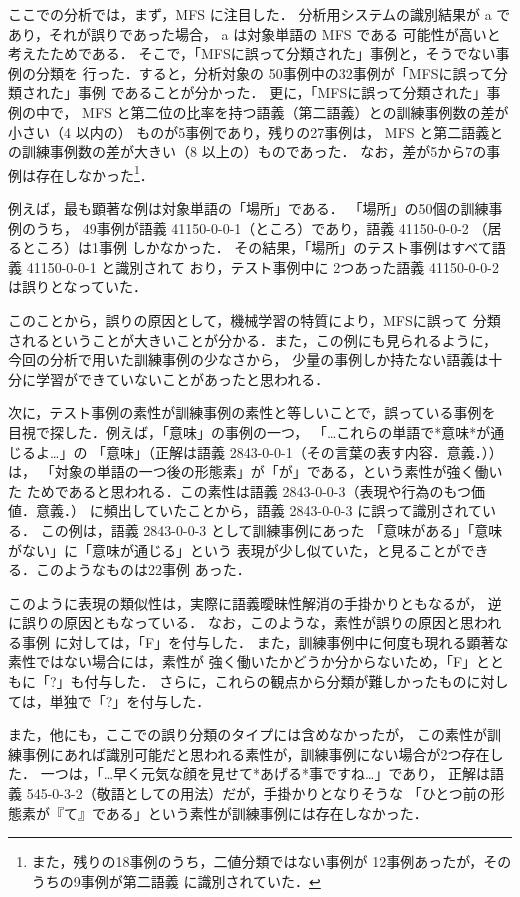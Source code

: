 \documentclass[japanese]{jnlp_1.4}
\begin{document}
ここでの分析では，まず，MFS に注目した．
分析用システムの識別結果が a であり，それが誤りであった場合，
a は対象単語の MFS である
可能性が高いと考えたためである．
そこで，「MFSに誤って分類された」事例と，そうでない事例の分類を
行った．すると，分析対象の 50事例中の32事例が「MFSに誤って分類された」事例
であることが分かった．
更に，「MFSに誤って分類された」事例の中で，
MFS と第二位の比率を持つ語義（第二語義）との訓練事例数の差が小さい（4 以内の）
ものが5事例であり，残りの27事例は，
MFS と第二語義との訓練事例数の差が大きい（8 以上の）ものであった．
なお，差が5から7の事例は存在しなかった\footnote{また，残りの18事例のうち，二値分類ではない事例が
12事例あったが，そのうちの9事例が第二語義
に識別されていた．}．


例えば，最も顕著な例は対象単語の「場所」である．
「場所」の50個の訓練事例のうち，
49事例が語義 41150-0-0-1（ところ）であり，語義 41150-0-0-2 （居るところ）は1事例
しかなかった．
その結果，「場所」のテスト事例はすべて語義 41150-0-0-1 と識別されて
おり，テスト事例中に 2つあった語義 41150-0-0-2は誤りとなっていた．

このことから，誤りの原因として，機械学習の特質により，MFSに誤って
分類されるということが大きいことが分かる．また，この例にも見られるように，
今回の分析で用いた訓練事例の少なさから，
少量の事例しか持たない語義は十分に学習ができていないことがあったと思われる．


次に，テスト事例の素性が訓練事例の素性と等しいことで，誤っている事例を
目視で探した．例えば，「意味」の事例の一つ，
「…これらの単語で*意味*が通じるよ…」の
「意味」（正解は語義 2843-0-0-1（その言葉の表す内容．意義．））は，
「対象の単語の一つ後の形態素」が「が」である，という素性が強く働いた
ためであると思われる．この素性は語義 2843-0-0-3（表現や行為のもつ価値．意義．）
に頻出していたことから，語義 2843-0-0-3 に誤って識別されている．
この例は，語義 2843-0-0-3 として訓練事例にあった
「意味がある」「意味がない」に「意味が通じる」という
表現が少し似ていた，と見ることができる．このようなものは22事例 あった．

このように表現の類似性は，実際に語義曖昧性解消の手掛かりともなるが，
逆に誤りの原因ともなっている．
なお，このような，素性が誤りの原因と思われる事例 に対しては，「F」を付与した．
また，訓練事例中に何度も現れる顕著な素性ではない場合には，素性が
強く働いたかどうか分からないため，「F」とともに「?」も付与した．
さらに，これらの観点から分類が難しかったものに対しては，単独で「?」を付与した．

また，他にも，ここでの誤り分類のタイプには含めなかったが，
この素性が訓練事例にあれば識別可能だと思われる素性が，訓練事例にない場合が2つ存在した．
一つは，「…早く元気な顔を見せて*あげる*事ですね…」であり，
正解は語義 545-0-3-2（敬語としての用法）だが，手掛かりとなりそうな
「ひとつ前の形態素が『て』である」という素性が訓練事例には存在しなかった．
\end{document}
